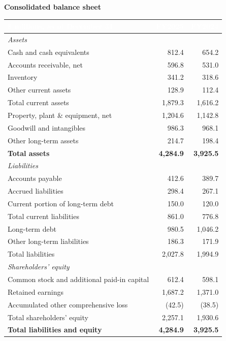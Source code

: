 \documentclass[11pt,oneside,a4paper]{scrbook}
\begin{document}
\vspace{16pt}
{\bfseries\color{merNavy} Consolidated balance sheet}\par
\vspace{4pt}
\begin{tabular}{lrr}
\toprule
\rowcolor{merNavy}
\textcolor{white}{\bfseries \$ millions, as of December 31} & \textcolor{white}{\bfseries FY2025} & \textcolor{white}{\bfseries FY2024} \\
\midrule
\multicolumn{3}{l}{\itshape Assets} \\
Cash and cash equivalents & 812.4 & 654.2 \\
Accounts receivable, net & 596.8 & 531.0 \\
Inventory & 341.2 & 318.6 \\
Other current assets & 128.9 & 112.4 \\
\midrule
Total current assets & 1,879.3 & 1,616.2 \\
Property, plant \& equipment, net & 1,204.6 & 1,142.8 \\
Goodwill and intangibles & 986.3 & 968.1 \\
Other long-term assets & 214.7 & 198.4 \\
\midrule
\rowcolor{merPaper}
\textbf{Total assets} & \textbf{4,284.9} & \textbf{3,925.5} \\
\midrule
\multicolumn{3}{l}{\itshape Liabilities} \\
Accounts payable & 412.6 & 389.7 \\
Accrued liabilities & 298.4 & 267.1 \\
Current portion of long-term debt & 150.0 & 120.0 \\
\midrule
Total current liabilities & 861.0 & 776.8 \\
Long-term debt & 980.5 & 1,046.2 \\
Other long-term liabilities & 186.3 & 171.9 \\
\midrule
Total liabilities & 2,027.8 & 1,994.9 \\
\midrule
\multicolumn{3}{l}{\itshape Shareholders' equity} \\
Common stock and additional paid-in capital & 612.4 & 598.1 \\
Retained earnings & 1,687.2 & 1,371.0 \\
Accumulated other comprehensive loss & (42.5) & (38.5) \\
\midrule
Total shareholders' equity & 2,257.1 & 1,930.6 \\
\midrule
\rowcolor{merPaper}
\textbf{Total liabilities and equity} & \textbf{4,284.9} & \textbf{3,925.5} \\
\bottomrule
\end{tabular}
\end{document}
